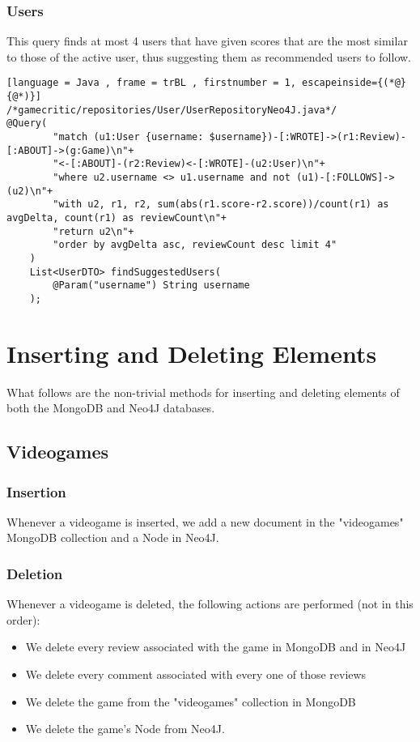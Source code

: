 \subsubsection{Users}
This query finds at most 4 users that have given scores that are the most similar to those of the active user, thus suggesting them as recommended users to follow.
\begin{lstlisting}[language = Java , frame = trBL , firstnumber = 1, escapeinside={(*@}{@*)}]
/*gamecritic/repositories/User/UserRepositoryNeo4J.java*/
@Query(
        "match (u1:User {username: $username})-[:WROTE]->(r1:Review)-[:ABOUT]->(g:Game)\n"+
        "<-[:ABOUT]-(r2:Review)<-[:WROTE]-(u2:User)\n"+
        "where u2.username <> u1.username and not (u1)-[:FOLLOWS]->(u2)\n"+
        "with u2, r1, r2, sum(abs(r1.score-r2.score))/count(r1) as avgDelta, count(r1) as reviewCount\n"+
        "return u2\n"+
        "order by avgDelta asc, reviewCount desc limit 4"
    )
    List<UserDTO> findSuggestedUsers(
        @Param("username") String username
    );
\end{lstlisting}
\section{Inserting and Deleting Elements}
What follows are the non-trivial methods for inserting and deleting elements of both the MongoDB and Neo4J databases.
\subsection{Videogames}
\subsubsection{Insertion}
Whenever a videogame is inserted, we add a new document in the "videogames" MongoDB collection and a Node in Neo4J.
\subsubsection{Deletion}
Whenever a videogame is deleted, the following actions are performed (not in this order):
\begin{itemize}
    \item We delete every review associated with the game in MongoDB and in Neo4J
    \item We delete every comment associated with every one of those reviews
    \item We delete the game from the "videogames" collection in MongoDB
    \item We delete the game's Node from Neo4J.
\end{itemize}
